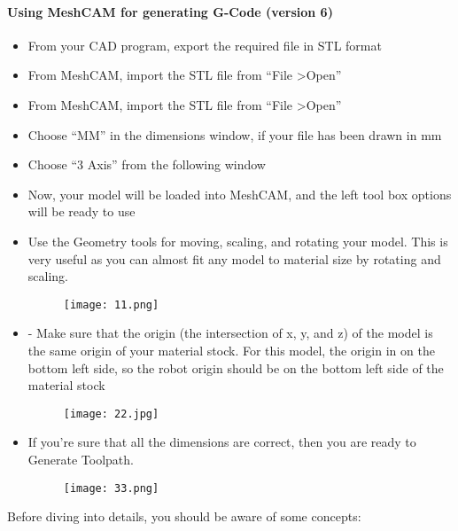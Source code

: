 \paragraph{Using MeshCAM for generating G-Code (version 6)}
\begin{itemize}
	\item From your CAD program, export the required file in STL format
	\item From MeshCAM, import the STL file from “File \textgreater Open”
	\item From MeshCAM, import the STL file from “File \textgreater Open”
	\item Choose “MM” in the dimensions window, if your file has been drawn in mm
	\item Choose “3 Axis” from the following window 
	\item Now, your model will be loaded into MeshCAM, and the left tool box options will be ready to use
	\item Use the Geometry tools for moving, scaling, and rotating your model. This is very useful as you can almost fit any model to material size by rotating and scaling.
	\begin{figure}[H]
		\centering
		\texttt{[image: 11.png]}
	\end{figure} 
\item -	Make sure that the origin (the intersection of x, y, and z) of the model is the same origin of your material stock. 
For this model, the origin in on the bottom left side, so the robot origin should be on the bottom left side of the material stock
\begin{figure}[H]
	\centering
	\texttt{[image: 22.jpg]}
\end{figure} 
\item If you’re sure that all the dimensions are correct, then you are ready to Generate Toolpath. 
\begin{figure}[ht]
	\centering
	\texttt{[image: 33.png]}
\end{figure}

\end{itemize}
Before diving into details, you should be aware of some concepts:
